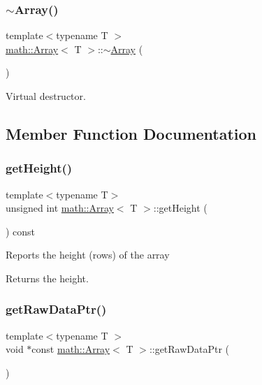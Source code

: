 \subsubsection{\texorpdfstring{$\sim$\+Array()}{~Array()}}
{\footnotesize\ttfamily template$<$typename T $>$ \\
\hyperlink{classmath_1_1_array}{math\+::\+Array}$<$ T $>$\+::$\sim$\hyperlink{classmath_1_1_array}{Array} (\begin{DoxyParamCaption}{ }\end{DoxyParamCaption})\hspace{0.3cm}{\ttfamily [virtual]}}

Virtual destructor. 

\subsection{Member Function Documentation}
\mbox{\label{classmath_1_1_array_a2ebce27bf14e2c7ea83b5004e1a83bc5}} 
\subsubsection{\texorpdfstring{get\+Height()}{getHeight()}}
{\footnotesize\ttfamily template$<$typename T$>$ \\
unsigned int \hyperlink{classmath_1_1_array}{math\+::\+Array}$<$ T $>$\+::get\+Height (\begin{DoxyParamCaption}{ }\end{DoxyParamCaption}) const\hspace{0.3cm}{\ttfamily [inline]}}

Reports the height (rows) of the array

\begin{DoxyReturn}{Returns}
the height. 
\end{DoxyReturn}
\mbox{\label{classmath_1_1_array_ab2a61b31ce041823cc17220033b1fe1a}} 
\subsubsection{\texorpdfstring{get\+Raw\+Data\+Ptr()}{getRawDataPtr()}}
{\footnotesize\ttfamily template$<$typename T $>$ \\
void $\ast$const \hyperlink{classmath_1_1_array}{math\+::\+Array}$<$ T $>$\+::get\+Raw\+Data\+Ptr (\begin{DoxyParamCaption}{ }\end{DoxyParamCaption})}

